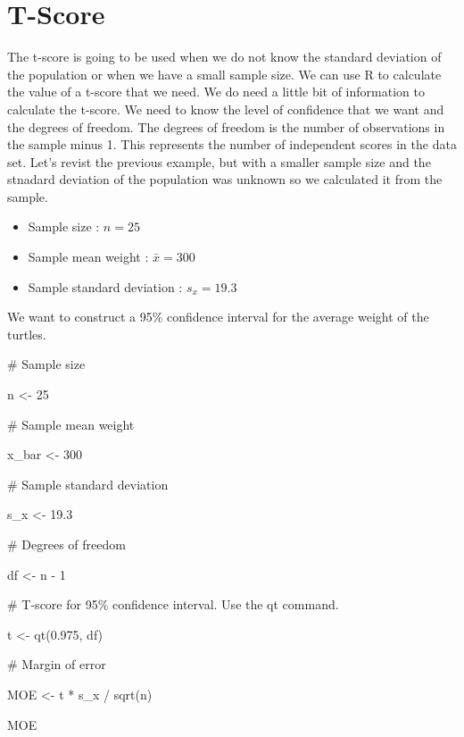 \documentclass[
  letterpaper,
  DIV=11,
  numbers=noendperiod]{scrreprt}
\newenvironment{Shaded}{\begin{snugshade}}{\end{snugshade}}
\newcommand{\CommentTok}[1]{\textcolor[rgb]{0.37,0.37,0.37}{#1}}
\newcommand{\DecValTok}[1]{\textcolor[rgb]{0.68,0.00,0.00}{#1}}
\newcommand{\FloatTok}[1]{\textcolor[rgb]{0.68,0.00,0.00}{#1}}
\newcommand{\FunctionTok}[1]{\textcolor[rgb]{0.28,0.35,0.67}{#1}}
\newcommand{\NormalTok}[1]{\textcolor[rgb]{0.00,0.23,0.31}{#1}}
\newcommand{\OtherTok}[1]{\textcolor[rgb]{0.00,0.23,0.31}{#1}}
\newcommand{\SpecialCharTok}[1]{\textcolor[rgb]{0.37,0.37,0.37}{#1}}
\providecommand{\tightlist}{%
  \setlength{\itemsep}{0pt}\setlength{\parskip}{0pt}}\usepackage{longtable,booktabs,array}
\begin{document}
\section*{T-Score}\label{t-score}


The t-score is going to be used when we do not know the standard
deviation of the population or when we have a small sample size. We can
use R to calculate the value of a t-score that we need. We do need a
little bit of information to calculate the t-score. We need to know the
level of confidence that we want and the degrees of freedom. The degrees
of freedom is the number of observations in the sample minus 1. This
represents the number of independent scores in the data set. Let's
revist the previous example, but with a smaller sample size and the
stnadard deviation of the population was unknown so we calculated it
from the sample.

\begin{itemize}
\tightlist
\item
  Sample size : \(n=25\)
\item
  Sample mean weight : \(\bar{x} = 300\)
\item
  Sample standard deviation : \(s_x = 19.3\)
\end{itemize}

We want to construct a 95\% confidence interval for the average weight
of the turtles.

\begin{Shaded}
\begin{Highlighting}[]
\CommentTok{\# Sample size}

\NormalTok{n }\OtherTok{\textless{}{-}} \DecValTok{25}

\CommentTok{\# Sample mean weight}

\NormalTok{x\_bar }\OtherTok{\textless{}{-}} \DecValTok{300}

\CommentTok{\# Sample standard deviation}

\NormalTok{s\_x }\OtherTok{\textless{}{-}} \FloatTok{19.3}

\CommentTok{\# Degrees of freedom}

\NormalTok{df }\OtherTok{\textless{}{-}}\NormalTok{ n }\SpecialCharTok{{-}} \DecValTok{1}

\CommentTok{\# T{-}score for 95\% confidence interval. Use the qt command.}

\NormalTok{t }\OtherTok{\textless{}{-}} \FunctionTok{qt}\NormalTok{(}\FloatTok{0.975}\NormalTok{, df)}

\CommentTok{\# Margin of error}

\NormalTok{MOE }\OtherTok{\textless{}{-}}\NormalTok{ t }\SpecialCharTok{*}\NormalTok{ s\_x }\SpecialCharTok{/} \FunctionTok{sqrt}\NormalTok{(n)}

\NormalTok{MOE}
\end{Highlighting}
\end{Shaded}
\end{document}
